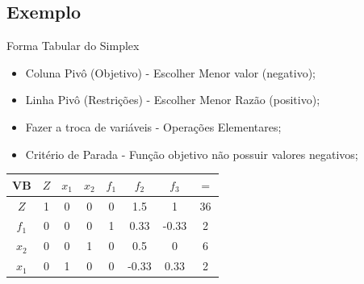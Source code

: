 \documentclass{if-beamer}
\begin{document}
\subsection{Exemplo}
\begin{frame}{Forma Tabular do Simplex}

\begin{itemize}
    \item {} Coluna Pivô (Objetivo) - Escolher Menor valor (negativo);
    \item {} Linha Pivô (Restrições) - Escolher Menor Razão (positivo);
    \item {} Fazer a troca de variáveis - Operações Elementares;
    \item {} Critério de Parada - Função objetivo não possuir valores negativos;
\end{itemize}

\begin{table}
    \centering
    \begin{tabular}{c|ccccccc}
    \hline
    VB    & $Z$ & $x_1$ & $x_2$ & $f_1$ & $f_2$ & $f_3$ & $=$  \\
    \hline
    $Z$   & 1   & 0     & 0     & 0     & 1.5   & 1     & 36   \\
    $f_1$ & 0   & 0     & 0     & 1     & 0.33  & -0.33 & 2    \\
    $x_2$ & 0   & 0     & 1     & 0     & 0.5   & 0     & 6    \\
    $x_1$ & 0   & 1     & 0     & 0     & -0.33 & 0.33  & 2    \\
    \hline
    \end{tabular}
\end{table}

\end{frame}

\end{document}
